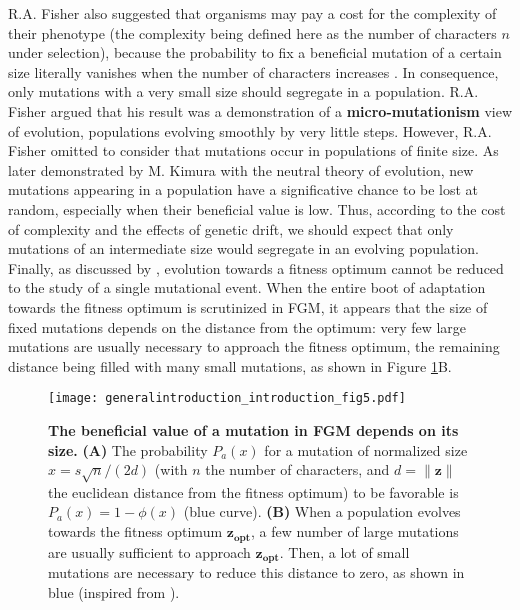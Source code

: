 R.A. Fisher also suggested that organisms may pay a cost for the complexity of their phenotype (the complexity being defined here as the number of characters $n$ under selection), because the probability to fix a beneficial mutation of a certain size literally vanishes when the number of characters increases \citep{orr-2000}. In consequence, only mutations with a very small size should segregate in a population. R.A. Fisher argued that his result was a demonstration of a \textbf{micro-mutationism} view of evolution, populations evolving smoothly by very little steps. However, R.A. Fisher omitted to consider that mutations occur in populations of finite size. As later demonstrated by M. Kimura with the neutral theory of evolution, new mutations appearing in a population have a significative chance to be lost at random, especially when their beneficial value is low. Thus, according to the cost of complexity and the effects of genetic drift, we should expect that only mutations of an intermediate size would segregate in an evolving population. Finally, as discussed by \cite{orr-2005}, evolution towards a fitness optimum cannot be reduced to the study of a single mutational event. When the entire boot of adaptation towards the fitness optimum is scrutinized in FGM, it appears that the size of fixed mutations depends on the distance from the optimum: very few large mutations are usually necessary to approach the fitness optimum, the remaining distance being filled with many small mutations, as shown in Figure \ref{fig:general_introduction:introduction:fig5}B.

\begin{figure}[!ht]
\centering
\texttt{[image: generalintroduction\_introduction\_fig5.pdf]}
\caption[The beneficial value of a mutation in FGM depends on its size.]{{\bf The beneficial value of a mutation in FGM depends on its size.}
\textbf{(A)} The probability $P_a(x)$ for a mutation of normalized size $x = s\sqrt{n}/(2d)$ (with $n$ the number of characters, and $d = \lVert \boldsymbol{z} \rVert$ the euclidean distance from the fitness optimum) to be favorable is $P_a(x) = 1-\phi(x)$ (blue curve). \textbf{(B)} When a population evolves towards the fitness optimum $\boldsymbol{z_{opt}}$, a few number of large mutations are usually sufficient to approach $\boldsymbol{z_{opt}}$. Then, a lot of small mutations are necessary to reduce this distance to zero, as shown in blue (inspired from \citealt{orr-2005}).}
\label{fig:general_introduction:introduction:fig5}
\end{figure}

